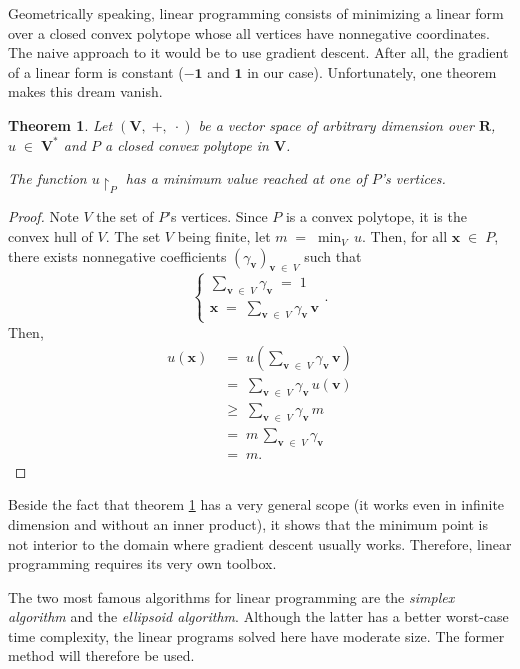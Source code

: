 \documentclass{report}
\theoremstyle{definition}
\theoremstyle{plain}
\newtheorem{thm}{Theorem}
\begin{document}
Geometrically speaking, linear programming consists of minimizing a linear form
over a closed convex polytope whose all vertices have nonnegative coordinates.
The naive approach to it would be to use gradient descent. After all, the
gradient of a linear form is constant ($-\mathbf 1$ and $\mathbf 1$ in our
case). Unfortunately, one theorem makes this dream vanish.
\begin{thm}
	\label{thm:minimum_vertex}
	Let $\left(\mathbf V,\; +,\; \cdot\right)$ be a vector space of
	arbitrary dimension over $\mathbf R$, $u\;\in\;\mathbf V^*$ and $P$ a
	closed convex polytope in $\mathbf V$.

	The function $u\upharpoonright_P$ has a minimum value reached at one
	of $P$'s vertices.
\end{thm}
\begin{proof}
	Note $V$ the set of $P$'s vertices. Since $P$ is a convex polytope, it
	is the convex hull of $V$. The set $V$ being finite, let
	$m\;=\;\min_V\,u$. Then, for all $\mathbf x\;\in\;P$, there exists
	nonnegative coefficients $\left(\gamma_\mathbf v\right)_{\mathbf
	v\;\in\;V}$ such that
	\[
		\begin{cases}
			\sum_{\mathbf v\;\in\;V}\gamma_\mathbf v\;=\;1 \\
			\mathbf x\;=\;\sum_{\mathbf v\;\in\;V}
				\gamma_\mathbf v\,\mathbf v
		\end{cases}.
	\]
	Then,
	\begin{align*}
		u\left(\mathbf x\right)\;&=\;u\left(\sum_{\mathbf v\;\in\;V}
				\gamma_\mathbf v\,\mathbf v\right) \\
			&=\;\sum_{\mathbf v\;\in\;V}
				\gamma_\mathbf v\,u\left(\mathbf v\right) \\
			&\geqslant\;\sum_{\mathbf v\;\in\;V}\gamma_\mathbf v\,m \\
			&=\;m\,\sum_{\mathbf v\;\in\;V}\gamma_\mathbf v \\
			&=\;m.
	\end{align*}
\end{proof}
Beside the fact that theorem \ref{thm:minimum_vertex} has a very general scope
(it works even in infinite dimension and without an inner product), it shows
that the minimum point is not interior to the domain where gradient descent
usually works. Therefore, linear programming requires its very own toolbox.

The two most famous algorithms for linear programming are the \emph{simplex
algorithm} and the \emph{ellipsoid algorithm}. Although the latter has a better
worst-case time complexity, the linear programs solved here have moderate size.
The former method will therefore be used.
\end{document}
